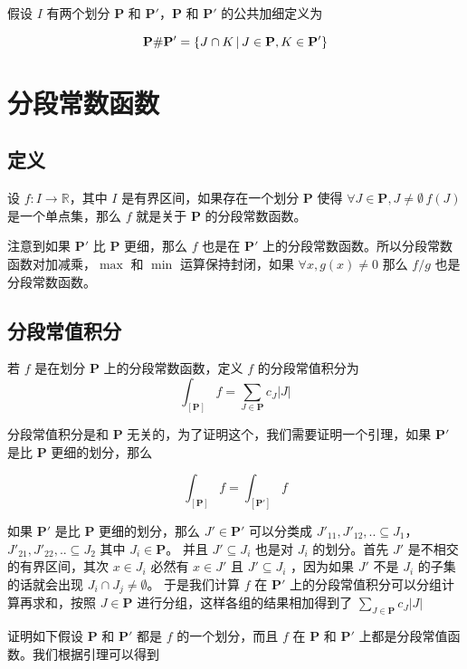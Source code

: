 假设 $I $ 有两个划分 $\mathbf{P}$ 和 $\mathbf{P'}$，$\mathbf{P}$ 和 $\mathbf{P'}$ 的公共加细定义为 

\[
    \mathbf{P} \# \mathbf{P'} = \{ J \cap K \,\vert\, J \in \mathbf{P}, K \in \mathbf{P'}\}
\]

\section{分段常数函数}

\subsection{定义}
设 $f: I \to \mathbb{R}$，其中 $I$ 是有界区间，如果存在一个划分 $\mathbf{P}$ 使得 $\forall J \in \mathbf{P}, J \ne \emptyset \, f(J)$ 是一个单点集，那么 $f$ 就是关于 $\mathbf{P}$ 的分段常数函数。

注意到如果 $\mathbf{P'}$ 比 $\mathbf{P}$ 更细，那么 $f$ 也是在 $\mathbf{P'}$ 上的分段常数函数。所以分段常数函数对加减乘，$\max$ 和 $\min$ 运算保持封闭，如果 $\forall x, g(x) \ne 0$ 那么 $f/g$ 也是分段常数函数。

\subsection{分段常值积分}

若 $f$ 是在划分 $\mathbf{P}$ 上的分段常数函数，定义 $f$ 的分段常值积分为 
\[
    \int_{[\mathbf{P}]} f = \sum_{J \in \mathbf{P}}c_J \lvert J \rvert
\]

分段常值积分是和 $\mathbf{P}$ 无关的，为了证明这个，我们需要证明一个引理，如果 $\mathbf{P'}$ 是比 $\mathbf{P}$ 更细的划分，那么

\[
    \int_{[\mathbf{P}]} f =\int_{[\mathbf{P'}]} f
\]

如果 $\mathbf{P'}$ 是比 $\mathbf{P}$ 更细的划分，那么 $J' \in \mathbf{P'}$ 可以分类成 $J'_{11}, J'_{12}, .. \subseteq J_1$， $J'_{21}, J'_{22}, .. \subseteq J_2$ 其中 $J_i \in \mathbf{P}$。
并且 $J' \subseteq J_i$ 也是对 $J_i$ 的划分。首先 $J'$ 是不相交的有界区间，其次 $x \in J_i$ 必然有 $x \in J'$ 且 $J' \subseteq J_i$ ，因为如果 $J'$ 不是 $J_i$ 的子集的话就会出现 $J_i \cap J_j \ne \emptyset$。
于是我们计算 $f$ 在 $\mathbf{P'}$ 上的分段常值积分可以分组计算再求和，按照 $J \in \mathbf{P}$ 进行分组，这样各组的结果相加得到了 $\sum_{J \in \mathbf{P}}c_J \lvert J \rvert$

证明如下假设 $\mathbf{P}$ 和 $\mathbf{P'}$ 都是 $f$ 的一个划分，而且 $f$ 在 $\mathbf{P}$ 和 $\mathbf{P'}$ 上都是分段常值函数。我们根据引理可以得到  

